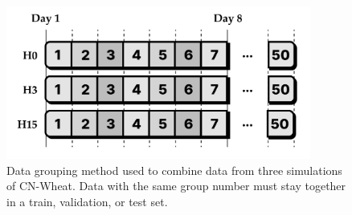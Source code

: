 \begin{figure}[]
	\centering
    \includegraphics[width=10cm]{img/cnw-grouping.png}
	
	\caption[Data grouping method used to combine data from three simulations of CN-Wheat.]{Data grouping method used to combine data from three simulations of CN-Wheat. Data with the same group number must stay together in a train, validation, or test set.}
	\label{fig:cnwheat-grouping}
\end{figure}